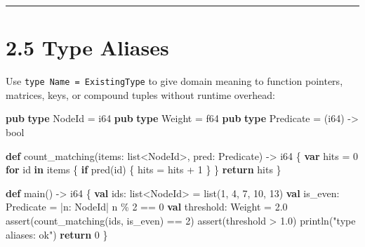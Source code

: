 \documentclass[
  english,
  oneside]{book}
\newenvironment{Shaded}{\begin{snugshade}}{\end{snugshade}}
\newcommand{\ControlFlowTok}[1]{\textcolor[rgb]{0.77,0.53,0.75}{\textbf{#1}}}
\newcommand{\DataTypeTok}[1]{\textcolor[rgb]{0.31,0.79,0.69}{#1}}
\newcommand{\DecValTok}[1]{\textcolor[rgb]{0.71,0.81,0.66}{#1}}
\newcommand{\FloatTok}[1]{\textcolor[rgb]{0.71,0.81,0.66}{#1}}
\newcommand{\FunctionTok}[1]{\textcolor[rgb]{0.86,0.86,0.67}{#1}}
\newcommand{\KeywordTok}[1]{\textcolor[rgb]{0.34,0.61,0.84}{\textbf{#1}}}
\newcommand{\NormalTok}[1]{\textcolor[rgb]{0.83,0.83,0.83}{#1}}
\newcommand{\OperatorTok}[1]{\textcolor[rgb]{0.83,0.83,0.83}{#1}}
\newcommand{\StringTok}[1]{\textcolor[rgb]{0.81,0.57,0.47}{#1}}
\begin{document}
\begin{center}\rule{0.5\linewidth}{0.5pt}\end{center}

\section{2.5 Type Aliases}\label{type-aliases}

Use \texttt{type\ Name\ =\ ExistingType} to give domain meaning to
function pointers, matrices, keys, or compound tuples without runtime
overhead:

\begin{Shaded}
\begin{Highlighting}[]
\KeywordTok{pub} \KeywordTok{type}\NormalTok{ NodeId }\OperatorTok{=} \DataTypeTok{i64}
\KeywordTok{pub} \KeywordTok{type}\NormalTok{ Weight }\OperatorTok{=} \DataTypeTok{f64}
\KeywordTok{pub} \KeywordTok{type}\NormalTok{ Predicate }\OperatorTok{=}\NormalTok{ (}\DataTypeTok{i64}\NormalTok{) }\OperatorTok{{-}\textgreater{}} \DataTypeTok{bool}

\KeywordTok{def}\NormalTok{ count\_matching(items: }\DataTypeTok{list}\OperatorTok{\textless{}}\NormalTok{NodeId}\OperatorTok{\textgreater{}}\NormalTok{, pred: Predicate) }\OperatorTok{{-}\textgreater{}} \DataTypeTok{i64}\NormalTok{ \{}
    \KeywordTok{var}\NormalTok{ hits }\OperatorTok{=} \DecValTok{0}
    \ControlFlowTok{for}\NormalTok{ id }\ControlFlowTok{in}\NormalTok{ items \{}
        \ControlFlowTok{if}\NormalTok{ pred(id) \{}
\NormalTok{            hits }\OperatorTok{=}\NormalTok{ hits }\OperatorTok{+} \DecValTok{1}
\NormalTok{        \}}
\NormalTok{    \}}
    \ControlFlowTok{return}\NormalTok{ hits}
\NormalTok{\}}

\KeywordTok{def}\NormalTok{ main() }\OperatorTok{{-}\textgreater{}} \DataTypeTok{i64}\NormalTok{ \{}
    \KeywordTok{val}\NormalTok{ ids: }\DataTypeTok{list}\OperatorTok{\textless{}}\NormalTok{NodeId}\OperatorTok{\textgreater{}} \OperatorTok{=} \DataTypeTok{list}\NormalTok{(}\DecValTok{1}\NormalTok{, }\DecValTok{4}\NormalTok{, }\DecValTok{7}\NormalTok{, }\DecValTok{10}\NormalTok{, }\DecValTok{13}\NormalTok{)}
    \KeywordTok{val}\NormalTok{ is\_even: Predicate }\OperatorTok{=} \OperatorTok{|}\NormalTok{n: NodeId}\OperatorTok{|}\NormalTok{ n }\OperatorTok{\%} \DecValTok{2} \OperatorTok{==} \DecValTok{0}
    \KeywordTok{val}\NormalTok{ threshold: Weight }\OperatorTok{=} \FloatTok{2.0}
    \FunctionTok{assert}\NormalTok{(count\_matching(ids, is\_even) }\OperatorTok{==} \DecValTok{2}\NormalTok{)}
    \FunctionTok{assert}\NormalTok{(threshold }\OperatorTok{\textgreater{}} \FloatTok{1.0}\NormalTok{)}
\NormalTok{    println(}\StringTok{"type aliases: ok"}\NormalTok{)}
    \ControlFlowTok{return} \DecValTok{0}
\NormalTok{\}}
\end{Highlighting}
\end{Shaded}
\end{document}
